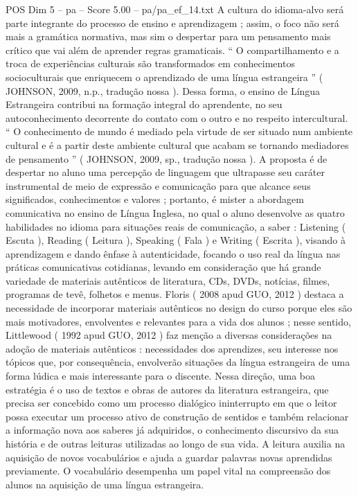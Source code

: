 \begin{textsample}{POS Dim 5 – pa – Score 5.00 – pa/pa\_ef\_14.txt}
A cultura do idioma-alvo será parte integrante do processo de ensino e aprendizagem ; assim, o foco não será mais a gramática normativa, mas sim o despertar para um pensamento mais crítico que vai além de aprender regras gramaticais. “ O compartilhamento e a troca de experiências culturais são transformados em conhecimentos socioculturais que enriquecem o aprendizado de uma língua estrangeira ” ( JOHNSON, 2009, n.p., tradução nossa ).
Dessa forma, o ensino de Língua Estrangeira contribui na formação integral do aprendente, no seu autoconhecimento decorrente do contato com o outro e no respeito intercultural. “ O conhecimento de mundo é mediado pela virtude de ser situado num ambiente cultural e é a partir deste ambiente cultural que acabam se tornando mediadores de pensamento ” ( JOHNSON, 2009, sp., tradução nossa ).
A proposta é de despertar no aluno uma percepção de linguagem que ultrapasse seu caráter instrumental de meio de expressão e comunicação para que alcance seus significados, conhecimentos e valores ; portanto, é mister a abordagem comunicativa no ensino de Língua Inglesa, no qual o aluno desenvolve as quatro habilidades no idioma para situações reais de comunicação, a saber : Listening ( Escuta ), Reading ( Leitura ), Speaking ( Fala ) e Writing ( Escrita ), visando à aprendizagem e dando ênfase à autenticidade, focando o uso real da língua nas práticas comunicativas cotidianas, levando em consideração que há grande variedade de materiais autênticos de literatura, CDs, DVDs, notícias, filmes, programas de tevê, folhetos e menus.
Floris ( 2008 apud GUO, 2012 ) destaca a necessidade de incorporar materiais autênticos no design do curso porque eles são mais motivadores, envolventes e relevantes para a vida dos alunos ; nesse sentido, Littlewood ( 1992 apud GUO, 2012 ) faz menção a diversas considerações na adoção de materiais autênticos : necessidades dos aprendizes, seu interesse nos tópicos que, por consequência, envolverão situações da língua estrangeira de uma forma lúdica e mais interessante para o discente.
Nessa direção, uma boa estratégia é o uso de textos e obras de autores da literatura estrangeira, que precisa ser concebido como um processo dialógico ininterrupto em que o leitor possa executar um processo ativo de construção de sentidos e também relacionar a informação nova aos saberes já adquiridos, o conhecimento discursivo da sua história e de outras leituras utilizadas ao longo de sua vida.
A leitura auxilia na aquisição de novos vocabulários e ajuda a guardar palavras novas aprendidas previamente.
O vocabulário desempenha um papel vital na compreensão dos alunos na aquisição de uma língua estrangeira.

\end{textsample}
